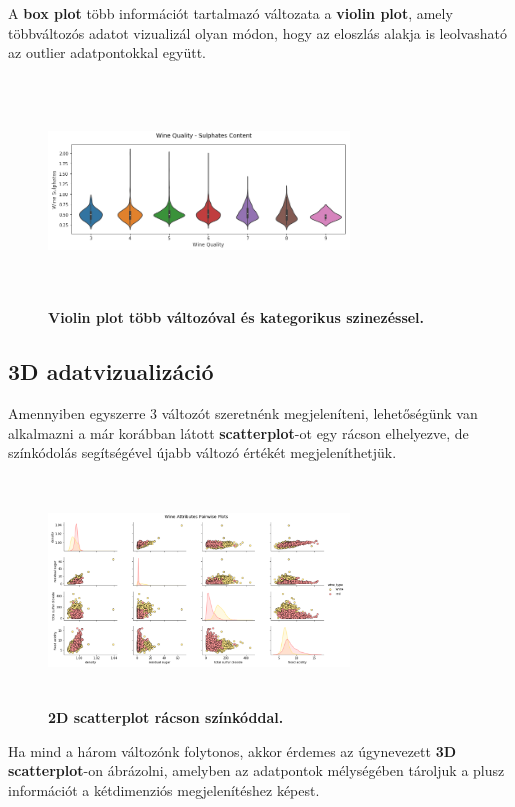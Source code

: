 \documentclass[12pt]{article}
\theoremstyle{plain}
\begin{document}
A \textbf{box plot} több információt tartalmazó változata a \textbf{violin plot}, amely többváltozós adatot vizualizál olyan módon, hogy az eloszlás alakja is leolvasható az outlier adatpontokkal együtt.


\begin{figure}[H]
    \centering
    \includegraphics[width=8cm, height=6cm]{media/violin.png}
    \caption{\textbf{Violin plot több változóval és kategorikus szinezéssel.}}
    \label{fig:GeneralDiagram}
 \end{figure}


\subsection{3D adatvizualizáció}
Amennyiben egyszerre 3 változót szeretnénk megjeleníteni, lehetőségünk van alkalmazni a már korábban látott \textbf{scatterplot}-ot egy rácson elhelyezve, de színkódolás segítségével újabb változó értékét megjeleníthetjük.

\begin{figure}[H]
    \centering
    \includegraphics[width=8cm, height=6cm]{media/3dscatter.png}
    \caption{\textbf{2D scatterplot rácson színkóddal.}}
    \label{fig:GeneralDiagram}
 \end{figure}
 
 Ha mind a három változónk folytonos, akkor érdemes az úgynevezett \textbf{3D scatterplot}-on ábrázolni, amelyben az adatpontok mélységében tároljuk a plusz információt a kétdimenziós megjelenítéshez képest.
 
\end{document}
